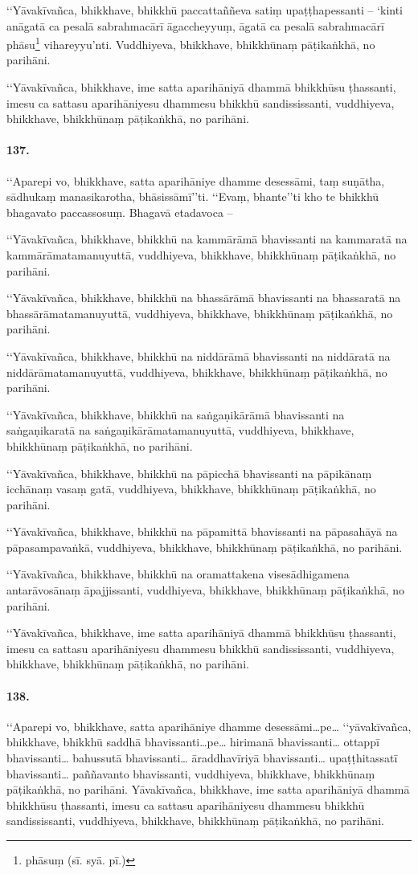 ‘‘Yāvakīvañca, bhikkhave, bhikkhū paccattaññeva satiṃ upaṭṭhapessanti – ‘kinti anāgatā ca pesalā sabrahmacārī āgaccheyyuṃ, āgatā ca pesalā sabrahmacārī phāsu\footnote{phāsuṃ (sī. syā. pī.)} vihareyyu’nti. Vuddhiyeva, bhikkhave, bhikkhūnaṃ pāṭikaṅkhā, no parihāni.

‘‘Yāvakīvañca, bhikkhave, ime satta aparihāniyā dhammā bhikkhūsu ṭhassanti, imesu ca sattasu aparihāniyesu dhammesu bhikkhū sandississanti, vuddhiyeva, bhikkhave, bhikkhūnaṃ pāṭikaṅkhā, no parihāni.

\paragraph{137.} ‘‘Aparepi vo, bhikkhave, satta aparihāniye dhamme desessāmi, taṃ suṇātha, sādhukaṃ manasikarotha, bhāsissāmī’’ti. ‘‘Evaṃ, bhante’’ti kho te bhikkhū bhagavato paccassosuṃ. Bhagavā etadavoca –

‘‘Yāvakīvañca, bhikkhave, bhikkhū na kammārāmā bhavissanti na kammaratā na kammārāmatamanuyuttā, vuddhiyeva, bhikkhave, bhikkhūnaṃ pāṭikaṅkhā, no parihāni.

‘‘Yāvakīvañca, bhikkhave, bhikkhū na bhassārāmā bhavissanti na bhassaratā na bhassārāmatamanuyuttā, vuddhiyeva, bhikkhave, bhikkhūnaṃ pāṭikaṅkhā, no parihāni.

‘‘Yāvakīvañca, bhikkhave, bhikkhū na niddārāmā bhavissanti na niddāratā na niddārāmatamanuyuttā, vuddhiyeva, bhikkhave, bhikkhūnaṃ pāṭikaṅkhā, no parihāni.

‘‘Yāvakīvañca, bhikkhave, bhikkhū na saṅgaṇikārāmā bhavissanti na saṅgaṇikaratā na saṅgaṇikārāmatamanuyuttā, vuddhiyeva, bhikkhave, bhikkhūnaṃ pāṭikaṅkhā, no parihāni.

‘‘Yāvakīvañca, bhikkhave, bhikkhū na pāpicchā bhavissanti na pāpikānaṃ icchānaṃ vasaṃ gatā, vuddhiyeva, bhikkhave, bhikkhūnaṃ pāṭikaṅkhā, no parihāni.

‘‘Yāvakīvañca, bhikkhave, bhikkhū na pāpamittā bhavissanti na pāpasahāyā na pāpasampavaṅkā, vuddhiyeva, bhikkhave, bhikkhūnaṃ pāṭikaṅkhā, no parihāni.

‘‘Yāvakīvañca, bhikkhave, bhikkhū na oramattakena visesādhigamena antarāvosānaṃ āpajjissanti, vuddhiyeva, bhikkhave, bhikkhūnaṃ pāṭikaṅkhā, no parihāni.

‘‘Yāvakīvañca, bhikkhave, ime satta aparihāniyā dhammā bhikkhūsu ṭhassanti, imesu ca sattasu aparihāniyesu dhammesu bhikkhū sandississanti, vuddhiyeva, bhikkhave, bhikkhūnaṃ pāṭikaṅkhā, no parihāni.

\paragraph{138.} ‘‘Aparepi vo, bhikkhave, satta aparihāniye dhamme desessāmi…pe… ‘‘yāvakīvañca, bhikkhave, bhikkhū saddhā bhavissanti…pe… hirimanā bhavissanti… ottappī bhavissanti… bahussutā bhavissanti… āraddhavīriyā bhavissanti… upaṭṭhitassatī bhavissanti… paññavanto bhavissanti, vuddhiyeva, bhikkhave, bhikkhūnaṃ pāṭikaṅkhā, no parihāni. Yāvakīvañca, bhikkhave, ime satta aparihāniyā dhammā bhikkhūsu ṭhassanti, imesu ca sattasu aparihāniyesu dhammesu bhikkhū sandississanti, vuddhiyeva, bhikkhave, bhikkhūnaṃ pāṭikaṅkhā, no parihāni.


